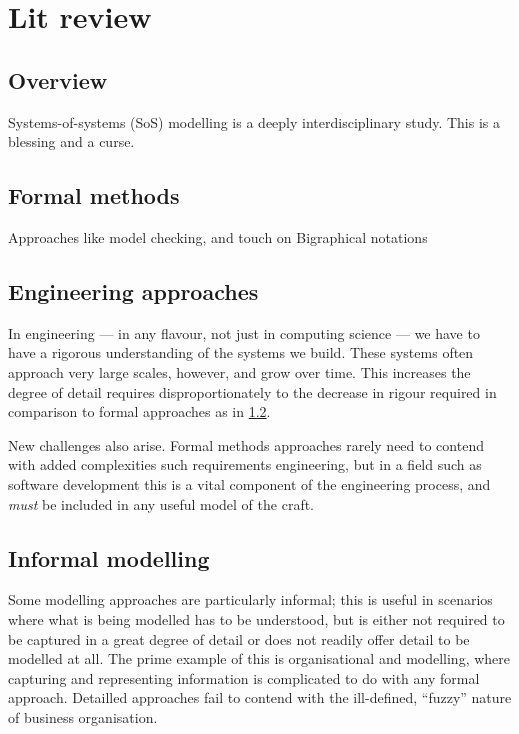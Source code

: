 \chapter{Lit review}

\section{Overview}

Systems-of-systems (SoS) modelling is a deeply interdisciplinary study. This is a blessing and a curse.
\par


\section{Formal methods}\label{sec:review-formal-methods}

Approaches like model checking, and touch on Bigraphical notations
\par

\section{Engineering approaches}

In engineering --- in any flavour, not just in computing science --- we have to have a rigorous understanding of the systems we build. 
These systems often approach very large scales, however, and grow over time.
This increases the degree of detail requires disproportionately to the decrease in rigour required in comparison to formal approaches as in \ref{sec:review-formal-methods}.
\par

New challenges also arise. Formal methods approaches rarely need to contend with added complexities such requirements engineering, but in a field such as software development this is a vital component of the engineering process, and \emph{must} be included in any useful model of the craft.
\par


\section{Informal modelling}
Some modelling approaches are particularly informal; this is useful in scenarios where what is being modelled has to be understood, but is either not required to be captured in a great degree of detail or does not readily offer detail to be modelled at all.
The prime example of this is organisational and modelling, where capturing and representing information is complicated to do with any formal approach.
Detailled approaches fail to contend with the ill-defined, ``fuzzy'' nature of business organisation.
\par

